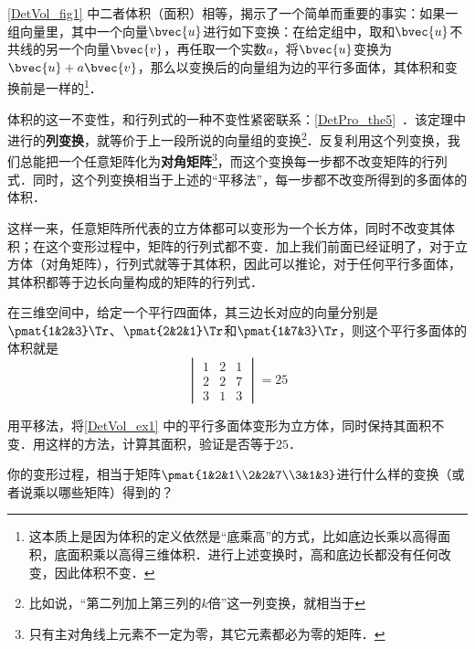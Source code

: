 \autoref{DetVol_fig1} 中二者体积（面积）相等，揭示了一个简单而重要的事实：如果一组向量里，其中一个向量$\bvec{u}$进行如下变换：在给定组中，取和$\bvec{u}$不共线的另一个向量$\bvec{v}$，再任取一个实数$a$，将$\bvec{u}$变换为$\bvec{u}+a\bvec{v}$，那么以变换后的向量组为边的平行多面体，其体积和变换前是一样的\footnote{这本质上是因为体积的定义依然是“底乘高”的方式，比如底边长乘以高得面积，底面积乘以高得三维体积．进行上述变换时，高和底边长都没有任何改变，因此体积不变．}．

体积的这一不变性，和行列式的一种不变性紧密联系：\autoref{DetPro_the5}~．该定理中进行的\textbf{列变换}，就等价于上一段所说的向量组的变换\footnote{比如说，“第二列加上第三列的$k$倍”这一列变换，就相当于}．反复利用这个列变换，我们总能把一个任意矩阵化为\textbf{对角矩阵}\footnote{只有主对角线上元素不一定为零，其它元素都必为零的矩阵．}，而这个变换每一步都不改变矩阵的行列式．同时，这个列变换相当于上述的“平移法”，每一步都不改变所得到的多面体的体积．

这样一来，任意矩阵所代表的立方体都可以变形为一个长方体，同时不改变其体积；在这个变形过程中，矩阵的行列式都不变．加上我们前面已经证明了，对于立方体（对角矩阵），行列式就等于其体积，因此可以推论，对于任何平行多面体，其体积都等于边长向量构成的矩阵的行列式．

\begin{example}{}\label{DetVol_ex1}
在三维空间中，给定一个平行四面体，其三边长对应的向量分别是$\pmat{1&2&3}\Tr$、$\pmat{2&2&1}\Tr$和$\pmat{1&7&3}\Tr$，则这个平行多面体的体积就是
\begin{equation}
\begin{vmatrix}
1&2&1\\
2&2&7\\
3&1&3
\end{vmatrix} = 25
\end{equation}
\end{example}

\begin{exercise}{}
用平移法，将\autoref{DetVol_ex1} 中的平行多面体变形为立方体，同时保持其面积不变．用这样的方法，计算其面积，验证是否等于$25$．

你的变形过程，相当于矩阵$\pmat{1&2&1\\2&2&7\\3&1&3}$进行什么样的变换（或者说乘以哪些矩阵）得到的？
\end{exercise}







